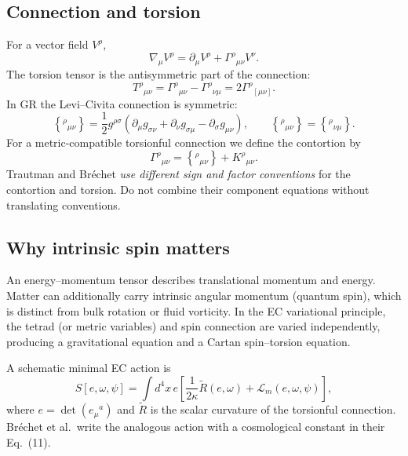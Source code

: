 \documentclass[11pt,a4paper]{article}
\begin{document}
\subsection{Connection and torsion}
For a vector field $V^\rho$,
\begin{equation}
\nabla_\mu V^\rho=\partial_\mu V^\rho+\Gamma^\rho{}_{\mu\nu}V^\nu.
\end{equation}
The torsion tensor is the antisymmetric part of the connection:
\begin{equation}
\boxed{T^\rho{}_{\mu\nu}=\Gamma^\rho{}_{\mu\nu}-\Gamma^\rho{}_{\nu\mu}
=2\Gamma^\rho{}_{[\mu\nu]}}.
\end{equation}
In GR the Levi--Civita connection is symmetric:
\begin{equation}
\left\{^\rho{}_{\mu\nu}\right\}=\frac12 g^{\rho\sigma}(\partial_\mu g_{\sigma\nu}
+\partial_\nu g_{\sigma\mu}-\partial_\sigma g_{\mu\nu}),
\qquad \left\{^\rho{}_{\mu\nu}\right\}=\left\{^\rho{}_{\nu\mu}\right\}.
\end{equation}
For a metric-compatible torsionful connection we define the contortion by
\begin{equation}
\Gamma^\rho{}_{\mu\nu}=\left\{^\rho{}_{\mu\nu}\right\}+K^\rho{}_{\mu\nu}.
\end{equation}
Trautman and Br\'echet \emph{use different sign and factor conventions} for the contortion and torsion. Do not combine their component equations without translating conventions.

\subsection{Why intrinsic spin matters}
An energy--momentum tensor describes translational momentum and energy. Matter can additionally carry intrinsic angular momentum (quantum spin), which is distinct from bulk rotation or fluid vorticity. In the EC variational principle, the tetrad (or metric variables) and spin connection are varied independently, producing a gravitational equation and a Cartan spin--torsion equation.

A schematic minimal EC action is
\begin{equation}
S[e,\omega,\psi]=\int d^4x\,e
\left[\frac{1}{2\kappa}\widetilde R(e,\omega)+\mathcal L_m(e,\omega,\psi)\right],
\end{equation}
where $e=\det(e_\mu{}^a)$ and $\widetilde R$ is the scalar curvature of the torsionful connection. Br\'echet et al.\ write the analogous action with a cosmological constant in their Eq.~(11).
\end{document}
